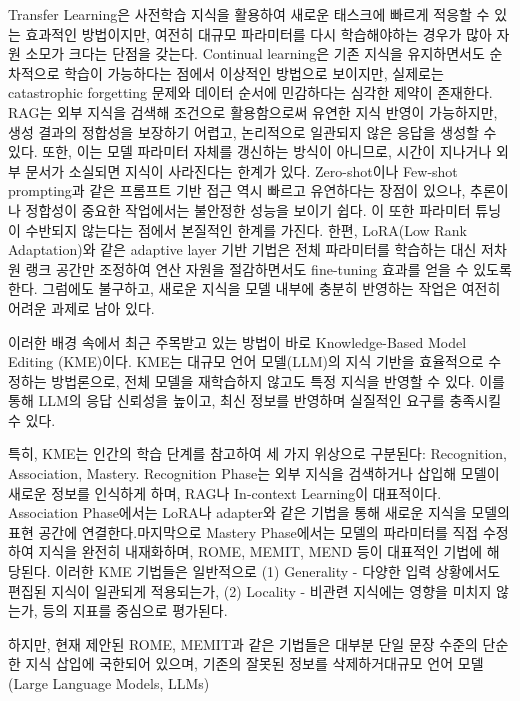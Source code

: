 \documentclass[a4paper,fleqn]{cas-sc}
\begin{document}
Transfer Learning은 사전학습 지식을 활용하여 새로운 태스크에 빠르게 적응할 수 있는 효과적인 방법이지만, 여전히 대규모 파라미터를 다시 학습해야하는 경우가 많아 자원 소모가 크다는 단점을 갖는다.
Continual learning은 기존 지식을 유지하면서도 순차적으로 학습이 가능하다는 점에서 이상적인 방법으로 보이지만, 실제로는 catastrophic forgetting 문제와 데이터 순서에 민감하다는 심각한 제약이 존재한다. 
RAG는 외부 지식을 검색해 조건으로 활용함으로써 유연한 지식 반영이 가능하지만, 생성 결과의 정합성을 보장하기 어렵고, 논리적으로 일관되지 않은 응답을 생성할 수 있다. 또한, 이는 모델 파라미터 자체를 갱신하는 방식이 아니므로, 시간이 지나거나 외부 문서가 소실되면 지식이 사라진다는 한계가 있다. 
Zero-shot이나 Few-shot prompting과 같은 프롬프트 기반 접근 역시 빠르고 유연하다는 장점이 있으나, 추론이나 정합성이 중요한 작업에서는 불안정한 성능을 보이기 쉽다. 이 또한 파라미터 튜닝이 수반되지 않는다는 점에서 본질적인 한계를 가진다.
한편, LoRA(Low Rank Adaptation)와 같은 adaptive layer 기반 기법은 전체 파라미터를 학습하는 대신 저차원 랭크 공간만 조정하여 연산 자원을 절감하면서도 fine-tuning 효과를 얻을 수 있도록한다. 그럼에도 불구하고, 새로운 지식을 모델 내부에 충분히 반영하는 작업은 여전히 어려운 과제로 남아 있다.

이러한 배경 속에서 최근 주목받고 있는 방법이 바로 Knowledge-Based Model Editing (KME)이다.
KME는 대규모 언어 모델(LLM)의 지식 기반을 효율적으로 수정하는 방법론으로, 전체 모델을 재학습하지 않고도 특정 지식을 반영할 수 있다.
이를 통해 LLM의 응답 신뢰성을 높이고, 최신 정보를 반영하며 실질적인 요구를 충족시킬 수 있다.

특히, KME는 인간의 학습 단계를 참고하여 세 가지 위상으로 구분된다: Recognition, Association, Mastery. Recognition Phase는 외부 지식을 검색하거나 삽입해 모델이 새로운 정보를 인식하게 하며, RAG나 In-context Learning이 대표적이다. Association Phase에서는 LoRA나 adapter와 같은 기법을 통해 새로운 지식을 모델의 표현 공간에 연결한다.마지막으로 Mastery Phase에서는 모델의 파라미터를 직접 수정하여 지식을 완전히 내재화하며, ROME, MEMIT, MEND 등이 대표적인 기법에 해당된다.
이러한 KME 기법들은 일반적으로 (1) Generality - 다양한 입력 상황에서도 편집된 지식이 일관되게 적용되는가, (2) Locality - 비관련 지식에는 영향을 미치지 않는가, 등의 지표를 중심으로 평가된다. 


하지만, 현재 제안된 ROME, MEMIT과 같은 기법들은 대부분 단일 문장 수준의 단순한 지식 삽입에 국한되어 있으며, 기존의 잘못된 정보를 삭제하거대규모 언어 모델(Large Language Models, LLMs)
\end{document}
